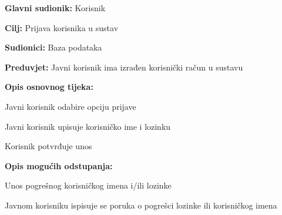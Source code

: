 					\noindent {}
					\begin{packed_item}
						
						\item \textbf{Glavni sudionik: } Korisnik
						\item  \textbf{Cilj:} Prijava korisnika u sustav 
						\item  \textbf{Sudionici:} Baza podataka
						\item  \textbf{Preduvjet:} Javni korisnik ima izrađen korisnički račun u sustavu
						\item  \textbf{Opis osnovnog tijeka:}
						
						\item[] \begin{packed_enum}
							
							\item Javni korisnik odabire opciju prijave
							\item Javni korisnik upisuje korisničko ime i lozinku
							\item Korisnik potvrđuje unos
						\end{packed_enum}
						
						\item  \textbf{Opis mogućih odstupanja:}
						
						\item[] \begin{packed_item}
							
							\item[2.a] Unos pogrešnog korisničkog imena i/ili lozinke
							\item[] \begin{packed_enum}
								
								\item Javnom korisniku ispisuje se poruka o pogrešci lozinke ili korisničkog imena
								
							\end{packed_enum}
							
						\end{packed_item}
					\end{packed_item}
				
				
				

